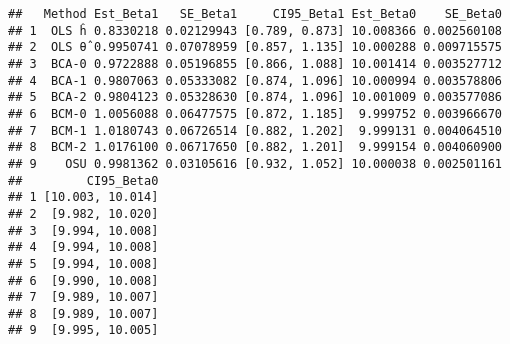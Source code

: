 \documentclass[
]{article}
\newenvironment{Shaded}{\begin{snugshade}}{\end{snugshade}}
\newcommand{\DecValTok}[1]{\textcolor[rgb]{0.00,0.00,0.81}{#1}}
\newcommand{\FunctionTok}[1]{\textcolor[rgb]{0.13,0.29,0.53}{\textbf{#1}}}
\newcommand{\NormalTok}[1]{#1}
\newcommand{\OtherTok}[1]{\textcolor[rgb]{0.56,0.35,0.01}{#1}}
\newcommand{\SpecialCharTok}[1]{\textcolor[rgb]{0.81,0.36,0.00}{\textbf{#1}}}
\newcommand{\StringTok}[1]{\textcolor[rgb]{0.31,0.60,0.02}{#1}}
\begin{document}
\begin{Shaded}
\end{Shaded}

\begin{verbatim}
##   Method Est_Beta1   SE_Beta1     CI95_Beta1 Est_Beta0    SE_Beta0
## 1  OLS ĥ 0.8330218 0.02129943 [0.789, 0.873] 10.008366 0.002560108
## 2  OLS θ̂ 0.9950741 0.07078959 [0.857, 1.135] 10.000288 0.009715575
## 3  BCA-0 0.9722888 0.05196855 [0.866, 1.088] 10.001414 0.003527712
## 4  BCA-1 0.9807063 0.05333082 [0.874, 1.096] 10.000994 0.003578806
## 5  BCA-2 0.9804123 0.05328630 [0.874, 1.096] 10.001009 0.003577086
## 6  BCM-0 1.0056088 0.06477575 [0.872, 1.185]  9.999752 0.003966670
## 7  BCM-1 1.0180743 0.06726514 [0.882, 1.202]  9.999131 0.004064510
## 8  BCM-2 1.0176100 0.06717650 [0.882, 1.201]  9.999154 0.004060900
## 9    OSU 0.9981362 0.03105616 [0.932, 1.052] 10.000038 0.002501161
##         CI95_Beta0
## 1 [10.003, 10.014]
## 2  [9.982, 10.020]
## 3  [9.994, 10.008]
## 4  [9.994, 10.008]
## 5  [9.994, 10.008]
## 6  [9.990, 10.008]
## 7  [9.989, 10.007]
## 8  [9.989, 10.007]
## 9  [9.995, 10.005]
\end{verbatim}
\end{document}
